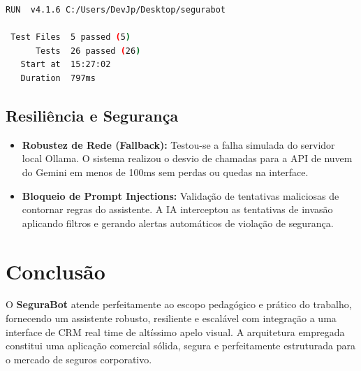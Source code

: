 \documentclass[12pt,a4paper]{article}
\begin{document}
\begin{lstlisting}[language=bash, caption=Resultado de Execução dos Testes Unitários e Integração.]
 RUN  v4.1.6 C:/Users/DevJp/Desktop/segurabot

 Test Files  5 passed (5)
      Tests  26 passed (26)
   Start at  15:27:02
   Duration  797ms
\end{lstlisting}

\subsection{Resiliência e Segurança}
\begin{itemize}
    \item \textbf{Robustez de Rede (Fallback):} Testou-se a falha simulada do servidor local Ollama. O sistema realizou o desvio de chamadas para a API de nuvem do Gemini em menos de 100ms sem perdas ou quedas na interface.
    \item \textbf{Bloqueio de Prompt Injections:} Validação de tentativas maliciosas de contornar regras do assistente. A IA interceptou as tentativas de invasão aplicando filtros e gerando alertas automáticos de violação de segurança.
\end{itemize}

\section{Conclusão}
O \textbf{SeguraBot} atende perfeitamente ao escopo pedagógico e prático do trabalho, fornecendo um assistente robusto, resiliente e escalável com integração a uma interface de CRM real time de altíssimo apelo visual. A arquitetura empregada constitui uma aplicação comercial sólida, segura e perfeitamente estruturada para o mercado de seguros corporativo.
\end{document}
